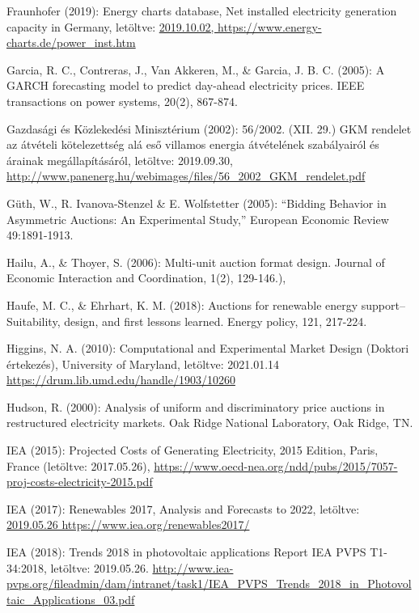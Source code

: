 \documentclass[twoside, magyar, showtrims]{corvinusphd}
\begin{document}
\begin{thebibliography}{99}
Fraunhofer (2019): Energy charts database, Net installed electricity generation capacity in Germany, letöltve:
\url{2019.10.02, https://www.energy-charts.de/power\_inst.htm}

Garcia, R. C., Contreras, J., Van Akkeren, M., \& Garcia, J. B. C. (2005): A GARCH forecasting model to predict day-ahead electricity prices. IEEE transactions on power systems, 20(2), 867-874.

Gazdasági és Közlekedési Minisztérium (2002): 56/2002. (XII. 29.) GKM rendelet 
az átvételi kötelezettség alá eső villamos energia átvételének szabályairól és árainak megállapításáról, letöltve: 2019.09.30, 
\url{http://www.panenerg.hu/webimages/files/56\_2002\_GKM\_rendelet.pdf}

Güth, W., R. Ivanova-Stenzel \& E. Wolfstetter (2005): “Bidding Behavior in Asymmetric Auctions: An Experimental Study,” European Economic Review 49:1891-1913.

Hailu, A., \& Thoyer, S. (2006): Multi-unit auction format design. Journal of Economic Interaction and Coordination, 1(2), 129-146.),

Haufe, M. C., \& Ehrhart, K. M. (2018): Auctions for renewable energy support–Suitability, design, and first lessons learned. Energy policy, 121, 217-224.

Higgins, N. A. (2010): Computational and Experimental Market Design (Doktori értekezés), University of Maryland, letöltve: 2021.01.14
\url{https://drum.lib.umd.edu/handle/1903/10260}

Hudson, R. (2000): Analysis of uniform and discriminatory price auctions in restructured electricity markets. Oak Ridge National Laboratory, Oak Ridge, TN.

IEA (2015): Projected Costs of Generating Electricity, 2015 Edition, Paris, France (letöltve: 2017.05.26),
\url{https://www.oecd-nea.org/ndd/pubs/2015/7057-proj-costs-electricity-2015.pdf}

IEA (2017): Renewables 2017, Analysis and Forecasts to 2022, letöltve:
\url{2019.05.26 https://www.iea.org/renewables2017/}

IEA (2018): Trends 2018 in photovoltaic applications Report IEA PVPS T1-34:2018, letöltve: 2019.05.26.
\url{http://www.iea-pvps.org/fileadmin/dam/intranet/task1/IEA\_PVPS\_Trends\_2018\_in\_Photovoltaic\_Applications\_03.pdf}


\end{thebibliography}
\end{document}
